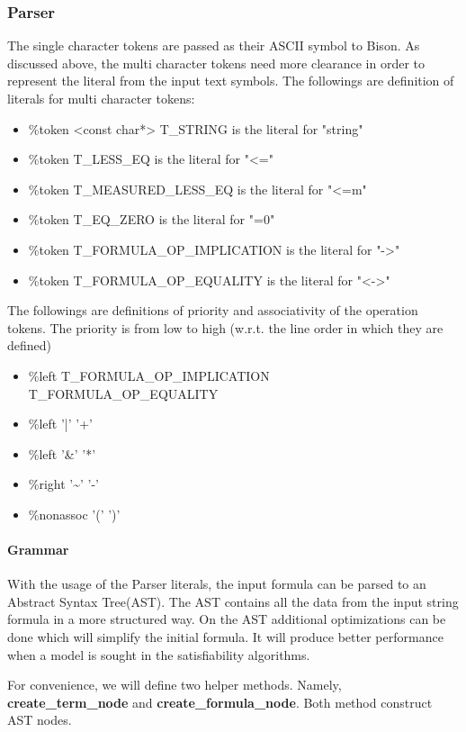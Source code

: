 \documentclass{article}
\begin{document}
	\subsubsection{Parser}
			The single character tokens are passed as their ASCII symbol to Bison. 
			As discussed above, the multi character tokens need more clearance in order to represent the literal from the input text symbols.
			The followings are definition of literals for multi character tokens:
			\begin{itemize}
				\item \%token <const char*> T\_STRING is the literal for "string"
				\item \%token T\_LESS\_EQ is the literal for "<="
				\item \%token T\_MEASURED\_LESS\_EQ is the literal for "<=m"
				\item \%token T\_EQ\_ZERO is the literal for "=0"
				\item \%token T\_FORMULA\_OP\_IMPLICATION is the literal for "->"
				\item \%token T\_FORMULA\_OP\_EQUALITY is the literal for "<->"
			\end{itemize}
			The followings are definitions of priority and associativity of the operation tokens. 
			The priority is from low to high (w.r.t. the line order in which they are defined)
			\begin{itemize}
				\item \%left T\_FORMULA\_OP\_IMPLICATION T\_FORMULA\_OP\_EQUALITY
				\item \%left '|' '+'
				\item \%left '\&' '*'
				\item \%right '\textasciitilde' '-'
				\item \%nonassoc '(' ')'
			\end{itemize}

		\paragraph{Grammar}
			With the usage of the Parser literals, the input formula can be parsed to an Abstract Syntax Tree(AST).
			The AST contains all the data from the input string formula in a more structured way.
			On the AST additional optimizations can be done which will simplify the initial formula. It will produce better performance when a model is sought in the satisfiability algorithms.

			For convenience, we will define two helper methods. Namely, \textbf{create\_term\_node} and \textbf{create\_formula\_node}. Both method construct AST nodes.
\end{document}
